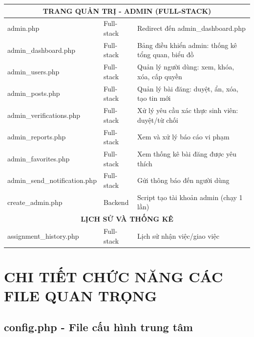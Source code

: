 \documentclass[a4paper,12pt]{article}
\begin{document}
\begin{longtable}{|p{4.5cm}|p{2cm}|p{8cm}|}
\multicolumn{3}{|c|}{\textbf{TRANG QUẢN TRỊ - ADMIN (FULL-STACK)}} \\
\hline
admin.php & Full-stack & Redirect đến admin\_dashboard.php \\
\hline
admin\_dashboard.php & Full-stack & Bảng điều khiển admin: thống kê tổng quan, biểu đồ \\
\hline
admin\_users.php & Full-stack & Quản lý người dùng: xem, khóa, xóa, cấp quyền \\
\hline
admin\_posts.php & Full-stack & Quản lý bài đăng: duyệt, ẩn, xóa, tạo tin mới \\
\hline
admin\_verifications.php & Full-stack & Xử lý yêu cầu xác thực sinh viên: duyệt/từ chối \\
\hline
admin\_reports.php & Full-stack & Xem và xử lý báo cáo vi phạm \\
\hline
admin\_favorites.php & Full-stack & Xem thống kê bài đăng được yêu thích \\
\hline
admin\_send\_notification.php & Full-stack & Gửi thông báo đến người dùng \\
\hline
create\_admin.php & Backend & Script tạo tài khoản admin (chạy 1 lần) \\
\hline

\multicolumn{3}{|c|}{\textbf{LỊCH SỬ VÀ THỐNG KÊ}} \\
\hline
assignment\_history.php & Full-stack & Lịch sử nhận việc/giao việc \\
\hline

\end{longtable}

\section{CHI TIẾT CHỨC NĂNG CÁC FILE QUAN TRỌNG}

\subsection{config.php - File cấu hình trung tâm}
\end{document}
